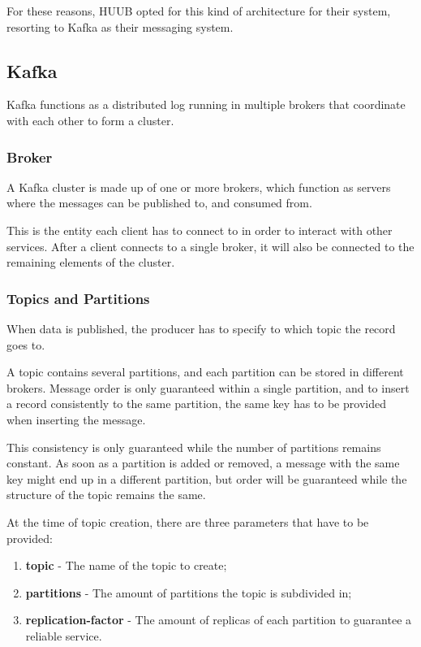 For these reasons, HUUB opted for this kind of architecture for their system, resorting to Kafka as their messaging system. 

\subsection{Kafka}

Kafka functions as a distributed log running in multiple brokers that coordinate with each other to form a cluster.

\subsubsection{Broker}

A Kafka cluster is made up of one or more brokers, which function as servers where the messages can be published to, and consumed from.

This is the entity each client has to connect to in order to interact with other services. After a client connects to a single broker, it will also be connected to the remaining elements of the cluster.

\subsubsection{Topics and Partitions}

When data is published, the producer has to specify to which topic the record goes to. 

A topic contains several partitions, and each partition can be stored in different brokers. Message order is only guaranteed within a single partition, and to insert a record consistently to the same partition, the same key has to be provided when inserting the message. 

This consistency is only guaranteed while the number of partitions remains constant. As soon as a partition is added or removed, a message with the same key might end up in a different partition, but order will be guaranteed while the structure of the topic remains the same.

At the time of topic creation, there are three parameters that have to be provided: 
\begin{enumerate}
    \item \textbf{topic} - The name of the topic to create;
    \item \textbf{partitions} - The amount of partitions the topic is subdivided in;
    \item \textbf{replication-factor} - The amount of replicas of each partition to guarantee a reliable service.
\end{enumerate}

